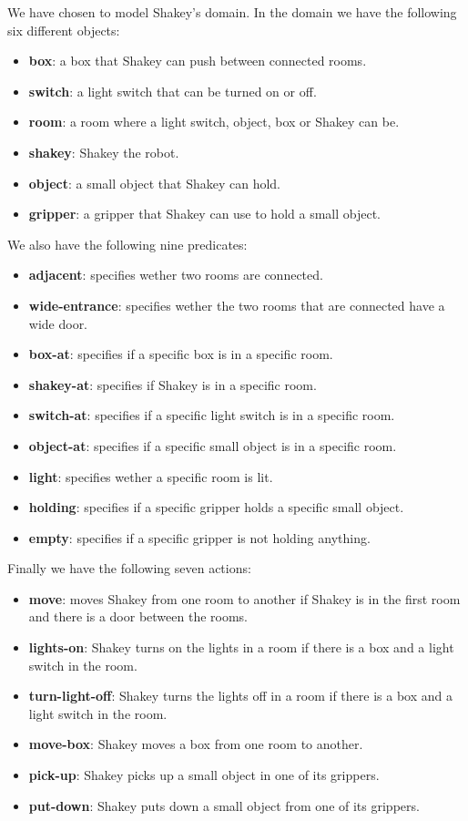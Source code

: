 \documentclass[a4paper,10pt]{article}
\begin{document}
We have chosen to model Shakey's domain.
In the domain we have the following six different objects:
\begin{itemize}
    \item \textbf{box}: a box that Shakey can push between connected rooms.
    \item \textbf{switch}: a light switch that can be turned on or off.
    \item \textbf{room}: a room where a light switch, object, box or Shakey can be.
    \item \textbf{shakey}: Shakey the robot.
    \item \textbf{object}: a small object that Shakey can hold.
    \item \textbf{gripper}: a gripper that Shakey can use to hold a small object.
\end{itemize}
We also have the following nine predicates:
\begin{itemize}
    \item \textbf{adjacent}: specifies wether two rooms are connected.
    \item \textbf{wide-entrance}: specifies wether the two rooms that are connected have a wide door.
    \item \textbf{box-at}: specifies if a specific box is in a specific room.
    \item \textbf{shakey-at}: specifies if Shakey is in a specific room.
    \item \textbf{switch-at}: specifies if a specific light switch is in a specific room.
    \item \textbf{object-at}: specifies if a specific small object is in a specific room.
    \item \textbf{light}: specifies wether a specific room is lit.
    \item \textbf{holding}: specifies if a specific gripper holds a specific small object.
    \item \textbf{empty}: specifies if a specific gripper is not holding anything.
\end{itemize}
Finally we have the following seven actions:
\begin{itemize}
    \item \textbf{move}: moves Shakey from one room to another if Shakey is in the first room and there is a door between the rooms.
    \item \textbf{lights-on}: Shakey turns on the lights in a room if there is a box and a light switch in the room.
    \item \textbf{turn-light-off}: Shakey turns the lights off in a room if there is a box and a light switch in the room.
    \item \textbf{move-box}: Shakey moves a box from one room to another.
    \item \textbf{pick-up}: Shakey picks up a small object in one of its grippers.
    \item \textbf{put-down}: Shakey puts down a small object from one of its grippers.
\end{itemize}
\end{document}
